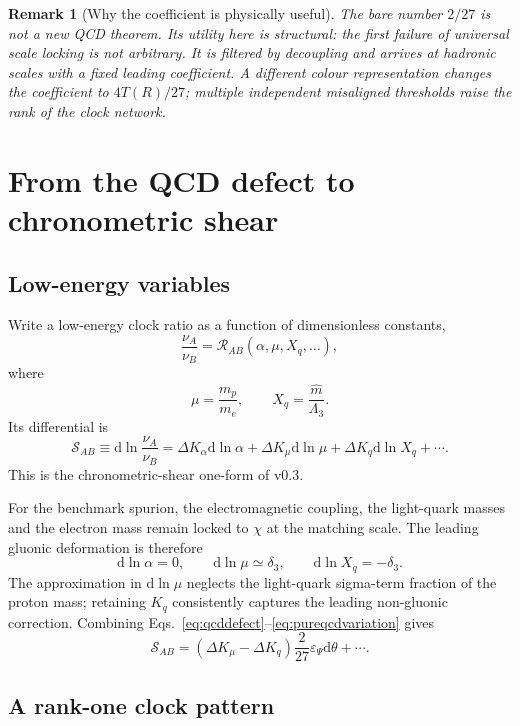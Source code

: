 \documentclass[11pt,a4paper]{article}
\newtheorem{remark}[definition]{Remark}
\newcommand{\dd}{\mathrm{d}}
\begin{document}
\begin{remark}[Why the coefficient is physically useful]
The bare number $2/27$ is not a new QCD theorem. Its utility here is structural: the first failure of universal scale locking is not arbitrary. It is filtered by decoupling and arrives at hadronic scales with a fixed leading coefficient. A different colour representation changes the coefficient to $4T(R)/27$; multiple independent misaligned thresholds raise the rank of the clock network.
\end{remark}

\section{From the QCD defect to chronometric shear}
\label{sec:clocks}

\subsection{Low-energy variables}

Write a low-energy clock ratio as a function of dimensionless constants,
\[
\frac{\nu_A}{\nu_B}
=\mathcal R_{AB}
\left(
\alpha,
\mu,
X_q,\ldots
\right),
\]
where
\[
\mu=\frac{m_p}{m_e},
\qquad
X_q=\frac{\widehat m}{\Lambda_3}.
\]
Its differential is
\[
\boxed{
\mathcal S_{AB}
\equiv\dd\ln\frac{\nu_A}{\nu_B}
=\Delta K_\alpha\dd\ln\alpha
+\Delta K_\mu\dd\ln\mu
+\Delta K_q\dd\ln X_q+\cdots.
}
\label{eq:sheargeneral}
\]
This is the chronometric-shear one-form of v0.3.

For the benchmark spurion, the electromagnetic coupling, the light-quark masses and the electron mass remain locked to $\chi$ at the matching scale. The leading gluonic deformation is therefore
\[
\dd\ln\alpha=0,
\qquad
\dd\ln\mu\simeq\delta_3,
\qquad
\dd\ln X_q=-\delta_3.
\label{eq:pureqcdvariation}
\]
The approximation in $\dd\ln\mu$ neglects the light-quark sigma-term fraction of the proton mass; retaining $K_q$ consistently captures the leading non-gluonic correction. Combining Eqs.~\eqref{eq:qcddefect}--\eqref{eq:pureqcdvariation} gives
\[
\boxed{
\mathcal S_{AB}
=(\Delta K_\mu-\Delta K_q)
\frac{2}{27}\varepsilon_\Psi\dd\theta
+\cdots.
}
\label{eq:shearprediction}
\]

\subsection{A rank-one clock pattern}
\end{document}
